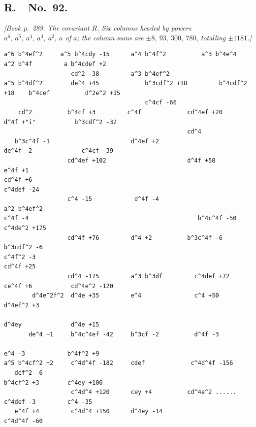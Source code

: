 \documentclass[11pt]{article}
\begin{document}
\bigskip

\subsection*{R.\ \ No.\ 92.}

\textit{[Book p.~289. The covariant $R$. Six columns headed by powers $a^6,\ a^5,\ a^4,\ a^3,\ a^2,\ a$ of $a$; the column sums are $\pm 8,\ 93,\ 300,\ 780$, totalling $\pm 1181$.]}

\smallskip

\begin{small}
\begin{verbatim}
a^6 b^4ef^2     a^5 b^4cdy -15      a^4 b^4f^2          a^3 b^4e^4         a^2 b^4f         a b^4cdef +2
                   cd^2 -38         a^3 b^4ef^2
a^5 b^4df^2        de^4 +45             b^3cdf^2 +18         b^4cdf^2 +18    b^4cef          d^2e^2 +15
                                        c^4cf -66
    cd^2          b^4cf +3         c^4f             cd^4ef +20       d^4f +"i"           b^3cdf^2 -32
                                                    cd^4
   b^3c^4f -1                       d^4ef +2                          de^4f -2              c^4cf -39
                  cd^4ef +102                       d^4f +58           e^4f +1
cd^4f +6                                                                                      c^4def -24
                  c^4 -15            d^4f -4                          a^2 b^4ef^2
c^4f -4                                                b^4c^4f -50                            c^4de^2 +175
                  cd^4f +76         d^4 +2          b^3c^4f -6           b^3cdf^2 -6
c^4f^2 -3                                                                                      cd^4f +25
                  cd^4 -175         a^3 b^3df         c^4def +72            ce^4f +6           cd^4e^2 -120
        d^4e^2f^2  d^4e +35         e^4               c^4 +50               d^4ef^2 +3
                                                                            d^4ey              d^4e +15
       de^4 +1     b^4c^4ef -42     b^3cf -2          d^4f -3
                                                                            e^4 -3            b^4f^2 +9
a^5 b^4cf^2 +2     c^4d^4f -182     cdef             c^4d^4f -156
   def^2 -6                                                                  b^4cf^2 +3        c^4ey +106
                   c^4d^4 +120      cey +4          cd^4e^2 ......           c^4def -3         c^4 -35
   e^4f +4         c^4d^4 +150      d^4ey -14                                                   c^4d^4f -60

\end{verbatim}
\end{small}
\end{document}
